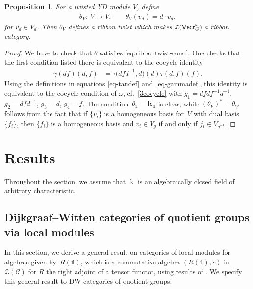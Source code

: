 \documentclass[pdftex]{sigma}
\numberwithin{equation}{section}
\newtheorem{Proposition}[Theorem]{Proposition}
 { \theoremstyle{definition}
\newtheorem{Definition}[Theorem]{Definition}
\newtheorem{Note}[Theorem]{Note}
\newtheorem{Notation}[Theorem]{Notation}
\newtheorem{Example}[Theorem]{Example}
\newtheorem{Remark}[Theorem]{Remark} }
\newcommand{\ide}{\mathsf{Id}}
\newcommand{\one}{\mathds{1}}
\newcommand{\Vect}{\mathsf{Vect}}
\newcommand{\cC}{\mathcal{C}}
\newcommand{\cZ}{\mathcal{Z}}
\begin{document}
\begin{Proposition}\label{prop:Zribbon}
For a twisted YD module $V$, define
\begin{align*}
\theta_V\colon\ V\to V, \qquad \theta_V(v_d)=d\cdot v_d,
\end{align*}
for $v_d\in V_d$. Then $\theta_V$ defines a ribbon twist which makes $\cZ\big(\Vect_G^\omega\big)$ a ribbon category.
\end{Proposition}
\begin{proof}
We have to check that $\theta$ satisfies \eqref{eq:ribbontwist-cond}. One checks that the first condition listed there is equivalent to the cocycle identity
\begin{align*}
 \gamma(df)(d,f)&=\tau\big(dfd^{-1},d\big)(d)\tau(d,f)(f).
\end{align*}
Using the definitions in equations \eqref{eq-taudef} and~\eqref{eq-gammadef}, this identity is equivalent to
the cocycle condition of $\omega$, cf.\ \eqref{3cocycle} with
$g_1=dfdf^{-1}d^{-1}$, $g_2=dfd^{-1}$, $g_3=d$, $g_4=f$. The condition~$\theta_\one=\ide_{\one}$ is clear, while $(\theta_V)^*=\theta_{V^*}$ follows from the fact that if $\{v_i\}$ is a homogeneous basis for~$V$ with dual basis~$\{f_i\}$, then $\{f_i\}$ is a homogeneous basis and $v_i\in V_g$ if and only if $f_i \in V_{g^{-1}}$.
\end{proof}



\section{Results}\label{sec:results}


Throughout the section, we assume that $\Bbbk$ is an algebraically closed field of arbitrary characteristic.


\subsection{Dijkgraaf--Witten categories of quotient groups via local modules}

In this section, we derive a general result on categories of local modules for algebras given by~$R(\one)$, which is a commutative algebra $(R(\one),c)$ in $\cZ(\cC)$ for $R$ the right adjoint of a tensor functor, using results of \cite{BN11,EGNO}. We specify this general result to DW categories of quotient groups.
\end{document}
